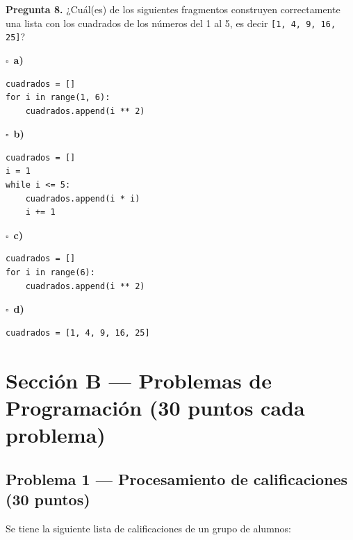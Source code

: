 \documentclass[12pt,a4paper]{article}
\begin{document}
\bigskip

\noindent\textbf{Pregunta 8.} ¿Cuál(es) de los siguientes fragmentos construyen correctamente una lista con los cuadrados de los números del 1 al 5, es decir \lstinline|[1, 4, 9, 16, 25]|?

\vspace{4pt}
\noindent$\square$\ \textbf{a)}
\begin{lstlisting}[style=PythonStyle, numbers=none, xleftmargin=1.5em]
cuadrados = []
for i in range(1, 6):
    cuadrados.append(i ** 2)
\end{lstlisting}

\vspace{2pt}
\noindent$\square$\ \textbf{b)}
\begin{lstlisting}[style=PythonStyle, numbers=none, xleftmargin=1.5em]
cuadrados = []
i = 1
while i <= 5:
    cuadrados.append(i * i)
    i += 1
\end{lstlisting}

\vspace{2pt}
\noindent$\square$\ \textbf{c)}
\begin{lstlisting}[style=PythonStyle, numbers=none, xleftmargin=1.5em]
cuadrados = []
for i in range(6):
    cuadrados.append(i ** 2)
\end{lstlisting}

\vspace{2pt}
\noindent$\square$\ \textbf{d)}
\begin{lstlisting}[style=PythonStyle, numbers=none, xleftmargin=1.5em]
cuadrados = [1, 4, 9, 16, 25]
\end{lstlisting}

\newpage

\section*{\color{anahuacblue}Sección B — Problemas de Programación \normalsize(30 puntos cada problema)}

\medskip

\subsection*{Problema 1 — Procesamiento de calificaciones (30 puntos)}

\noindent Se tiene la siguiente lista de calificaciones de un grupo de alumnos:
\end{document}
